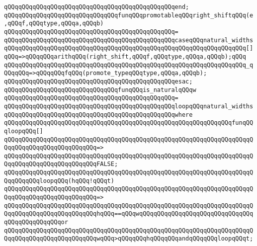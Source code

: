 \verb|qQQqqQQqqQQqqQQqqQQqqQQqqQQqqQQqqQQqqQQqqQQqqQQqend;|\newline
\newline
\verb|qQQqqQQqqQQqqQQqqQQqqQQqqQQqqQQqfunqQQqpromotableqQQqright_shiftqQQq(e,qQQqf,qQQqtype,qQQqa,qQQqb)|\newline
\verb|qQQqqQQqqQQqqQQqqQQqqQQqqQQqqQQqqQQqqQQqqQQqqQQq=|\newline
\verb|qQQqqQQqqQQqqQQqqQQqqQQqqQQqqQQqqQQqqQQqqQQqqQQqcaseqQQqnatural_widths|\newline
\newline
\verb|qQQqqQQqqQQqqQQqqQQqqQQqqQQqqQQqqQQqqQQqqQQqqQQqqQQqqQQqqQQqqQQqqQQq[]qQQq=>qQQqqQQqarithqQQq(right_shift,qQQqf,qQQqtype,qQQqa,qQQqb);qQQq|\newline
\verb|qQQqqQQqqQQqqQQqqQQqqQQqqQQqqQQqqQQqqQQqqQQqqQQqqQQqqQQqqQQqqQQqqQQq_qQQqqQQq=>qQQqqQQqfqQQq(promote_typeqQQqtype,qQQqa,qQQqb);|\newline
\verb|qQQqqQQqqQQqqQQqqQQqqQQqqQQqqQQqqQQqqQQqqQQqqQQqesac;|\newline
\newline
\verb|qQQqqQQqqQQqqQQqqQQqqQQqqQQqqQQqfunqQQqis_naturalqQQqw|\newline
\verb|qQQqqQQqqQQqqQQqqQQqqQQqqQQqqQQqqQQqqQQqqQQqqQQq=|\newline
\verb|qQQqqQQqqQQqqQQqqQQqqQQqqQQqqQQqqQQqqQQqqQQqqQQqloopqQQqnatural_widths|\newline
\verb|qQQqqQQqqQQqqQQqqQQqqQQqqQQqqQQqqQQqqQQqqQQqqQQqwhere|\newline
\verb|qQQqqQQqqQQqqQQqqQQqqQQqqQQqqQQqqQQqqQQqqQQqqQQqqQQqqQQqqQQqqQQqfunqQQqloopqQQq[]|\newline
\verb|qQQqqQQqqQQqqQQqqQQqqQQqqQQqqQQqqQQqqQQqqQQqqQQqqQQqqQQqqQQqqQQqqQQqqQQqqQQqqQQqqQQqqQQqqQQqqQQq=>|\newline
\verb|qQQqqQQqqQQqqQQqqQQqqQQqqQQqqQQqqQQqqQQqqQQqqQQqqQQqqQQqqQQqqQQqqQQqqQQqqQQqqQQqqQQqqQQqqQQqqQQqFALSE;|\newline
\newline
\verb|qQQqqQQqqQQqqQQqqQQqqQQqqQQqqQQqqQQqqQQqqQQqqQQqqQQqqQQqqQQqqQQqqQQqqQQqqQQqqQQqloopqQQq(hqQQq!qQQqt)|\newline
\verb|qQQqqQQqqQQqqQQqqQQqqQQqqQQqqQQqqQQqqQQqqQQqqQQqqQQqqQQqqQQqqQQqqQQqqQQqqQQqqQQqqQQqqQQqqQQqqQQq=>|\newline
\verb|qQQqqQQqqQQqqQQqqQQqqQQqqQQqqQQqqQQqqQQqqQQqqQQqqQQqqQQqqQQqqQQqqQQqqQQqqQQqqQQqqQQqqQQqqQQqqQQqhqQQq==qQQqwqQQqqQQqqQQqqQQqqQQqqQQqqQQqqQQqqQQqqQQqqQQqqQQqor|\newline
\verb|qQQqqQQqqQQqqQQqqQQqqQQqqQQqqQQqqQQqqQQqqQQqqQQqqQQqqQQqqQQqqQQqqQQqqQQqqQQqqQQqqQQqqQQqqQQqqQQqwqQQq>qQQqqQQqhqQQqqQQqandqQQqqQQqloopqQQqt;|\newline

